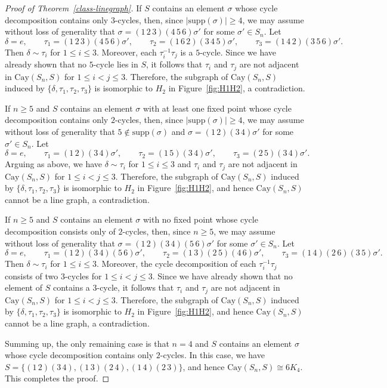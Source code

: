 \documentclass[12pt, a4paper]{article}
\theoremstyle{definition}
\begin{document}
\begin{proof}[Proof of Theorem~\ref{class-linegraph}]
If $S$ contains an element $\sigma$ whose cycle decomposition contains only $3$-cycles, then, since $|\mathrm{supp}(\sigma)|\ge 4$, we may assume without loss of generality that
\(
\sigma=(1\,2\,3)(4\,5\,6)\sigma'
\)
for some $\sigma' \in S_n$. Let
\[
\delta=e,\qquad
\tau_1=(1\,2\,3)(4\,5\,6)\sigma',\qquad
\tau_2=(1\,6\,2)(3\,4\,5)\sigma',\qquad
\tau_3=(1\,4\,2)(3\,5\,6)\sigma'.
\]
Then $\delta\sim\tau_i$ for $1\le i\le 3$. Moreover, each $\tau_i^{-1}\tau_j$ is a $5$-cycle. Since we have already shown that no $5$-cycle lies in $S$, it follows that $\tau_i$ and $\tau_j$ are not adjacent in $\mathrm{Cay}(S_n,S)$ for $1\le i<j\le 3$. Therefore, the subgraph of $\mathrm{Cay}(S_n,S)$ induced by $\{\delta,\tau_1,\tau_2,\tau_3\}$ is isomorphic to $H_2$ in Figure~\ref{fig:H1H2}, a contradiction.


If $n\ge 5$ and $S$ contains an element $\sigma$ with at least one fixed point whose cycle decomposition contains only $2$-cycles, then, since $|\mathrm{supp}(\sigma)|\ge 4$, we may assume without loss of generality that $5 \notin \mathrm{supp}(\sigma)$ and $\sigma=(1\,2)(3\,4)\sigma'$ for some $\sigma' \in S_n$. Let
$$
\delta=e,\qquad
\tau_1=(1\,2)(3\,4)\sigma',\qquad
\tau_2=(1\,5)(3\,4)\sigma',\qquad
\tau_3=(2\,5)(3\,4)\sigma'.
$$
Arguing as above, we have $\delta\sim\tau_i$ for $1\le i\le 3$ and $\tau_i$ and $\tau_j$ are not adjacent in $\mathrm{Cay}(S_n,S)$ for $1\le i<j\le 3$. Therefore, the subgraph of $\mathrm{Cay}(S_n,S)$ induced by $\{\delta,\tau_1,\tau_2,\tau_3\}$ is isomorphic to $H_2$ in Figure~\ref{fig:H1H2}, and hence $\mathrm{Cay}(S_n,S)$ cannot be a line graph, a contradiction.

If $n\ge 5$ and $S$ contains an element $\sigma$ with no fixed point whose cycle decomposition consists only of $2$-cycles, then, since $n\ge 5$, we may assume without loss of generality that
$\sigma=(1\,2)(3\,4)(5\,6)\sigma'$ for some $\sigma' \in S_n$. Let
$$
\delta=e,\qquad
\tau_1=(1\,2)(3\,4)(5\,6)\sigma',\qquad
\tau_2=(1\,3)(2\,5)(4\,6)\sigma',\qquad
\tau_3=(1\,4)(2\,6)(3\,5)\sigma'.
$$
Then $\delta\sim\tau_i$ for $1\le i\le 3$. Moreover, the cycle decomposition of each $\tau_i^{-1}\tau_j$ consists of two $3$-cycles for $1\le i<j\le 3$. Since we have already shown that no element of $S$ contains a $3$-cycle, it follows that $\tau_i$ and $\tau_j$ are not adjacent in $\mathrm{Cay}(S_n,S)$ for $1\le i<j\le 3$. Therefore, the subgraph of $\mathrm{Cay}(S_n,S)$ induced by $\{\delta,\tau_1,\tau_2,\tau_3\}$ is isomorphic to $H_2$ in Figure~\ref{fig:H1H2}, and hence $\mathrm{Cay}(S_n,S)$ cannot be a line graph, a contradiction.

Summing up, the only remaining case is that $n=4$ and $S$ contains an element $\sigma$ whose cycle decomposition contains only $2$-cycles. In this case, we have $S=\{(1\,2)(3\,4), \allowbreak (1\,3)(2\,4), \allowbreak (1\,4)(2\,3)\}$,  and hence $\mathrm{Cay}(S_n,S)\cong 6K_4$. This completes the proof.
\end{proof}
\end{document}
